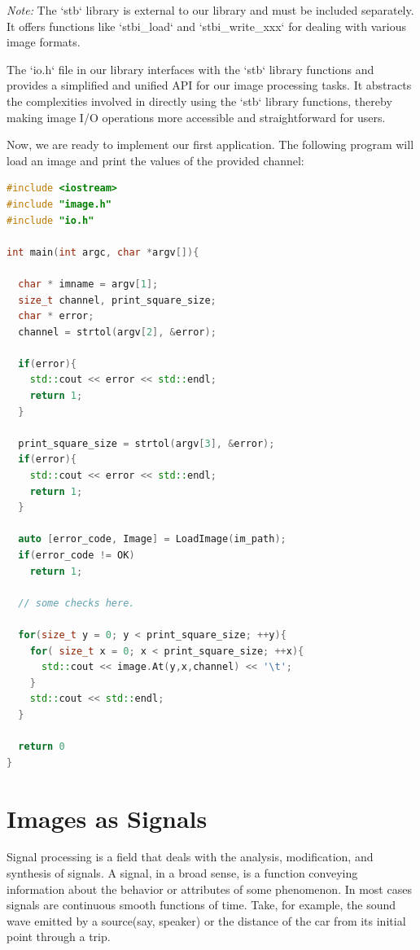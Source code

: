 \documentclass[11pt]{book}
\begin{document}
\textit{Note:} The `stb` library is external to our library and must be included separately. It offers functions like `stbi\_load` and `stbi\_write\_xxx` for dealing with various image formats.


The `io.h` file in our library interfaces with the `stb` library functions and provides a simplified and unified API for our image processing tasks. It abstracts the complexities involved in directly using the `stb` library functions, thereby making image I/O operations more accessible and straightforward for users.


Now, we are ready to implement our first application. The following program will load an image and print the values of the provided channel:

\begin{lstlisting}[language=C++, caption={A simple application that prints some pixel values}]
#include <iostream>
#include "image.h"
#include "io.h"

int main(int argc, char *argv[]){

  char * imname = argv[1];
  size_t channel, print_square_size;
  char * error;
  channel = strtol(argv[2], &error);
  
  if(error){
    std::cout << error << std::endl;
    return 1;
  }
  
  print_square_size = strtol(argv[3], &error);
  if(error){
    std::cout << error << std::endl;
    return 1;
  }
  
  auto [error_code, Image] = LoadImage(im_path);
  if(error_code != OK)
    return 1;
  
  // some checks here.
  
  for(size_t y = 0; y < print_square_size; ++y){
    for( size_t x = 0; x < print_square_size; ++x){
      std::cout << image.At(y,x,channel) << '\t';
    }
    std::cout << std::endl;
  }
  
  return 0
}	
 \end{lstlisting}

\newpage
\section{Images as Signals}

Signal processing is a field that deals with the analysis, modification, and synthesis of signals. A signal, in a broad sense, is a function conveying information about the behavior or attributes of some phenomenon. In most cases signals are continuous smooth functions of time. Take, for example, the sound wave emitted by a source(say, speaker) or the distance of the car from its initial point through a trip.  
\end{document}
